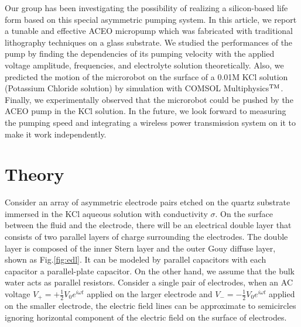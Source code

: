 \documentclass[journal,svgnames,twocolumn,x11names]{IEEEtran}
\begin{document}
Our group has been investigating the possibility of realizing a silicon-based life form based on this special asymmetric pumping system. In this article, we report a tunable and effective ACEO micropump which was fabricated with traditional lithography techniques on a glass substrate. We studied the performances of the pump by finding the dependencies of its pumping velocity with the applied voltage amplitude, frequencies, and electrolyte solution theoretically. Also, we predicted the motion of the microrobot on the surface of a 0.01M KCl solution (Potassium Chloride solution) by simulation with COMSOL Multiphysics$\rm^{TM}$. Finally, we experimentally observed that the microrobot could be pushed by the ACEO pump in the KCl solution. In the future, we look forward to measuring the pumping speed and integrating a wireless power transmission system on it to make it work independently.


\section{Theory}
Consider an array of asymmetric electrode pairs etched on the quartz substrate immersed in the KCl aqueous solution with conductivity $\sigma$. On the surface between the fluid and the electrode, there will be an electrical double layer that consists of two parallel layers of charge surrounding the electrodes. The double layer is composed of the inner Stern layer and the outer Gouy diffuse layer, shown as Fig.\ref{fig:edl}. It can be modeled by parallel capacitors with each capacitor a parallel-plate capacitor. On the other hand, we assume that the bulk water acts as parallel resistors. Consider a single pair of electrodes, when an AC voltage $V_+=+\frac{1}{2}V_0e^{i\omega t}$ applied on the larger electrode and $V_-=-\frac{1}{2}V_0e^{i\omega t}$ applied on the smaller electrode, the electric field lines can be approximate to semicircles ignoring horizontal component of the electric field on the surface of electrodes.
\end{document}
